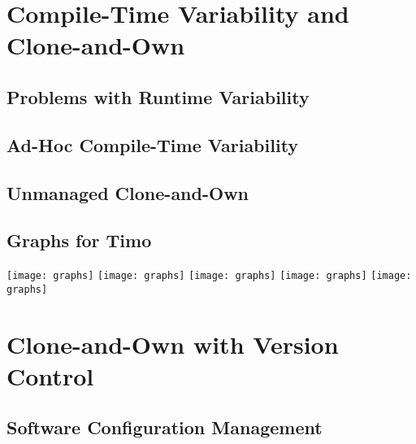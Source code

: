 \documentclass[
	aspectratio=169, %
	8pt, %
	handout, %
]{beamer}
\subtitle{3. Compile-Time Variability with Clone-and-Own}
\author{Timo Kehrer}
\begin{document}



\section{Compile-Time Variability and Clone-and-Own}

\subsection{Problems with Runtime Variability}
\subsection{Ad-Hoc Compile-Time Variability}
\subsection{Unmanaged Clone-and-Own}

\subsection{Graphs for Timo}
\begin{frame}{\insertsubsection}
	\begin{mycolumns}[columns=5]
		\texttt{[image: graphs]}
	\mynextcolumn
		\texttt{[image: graphs]}
	\mynextcolumn
		\texttt{[image: graphs]}
	\mynextcolumn
		\texttt{[image: graphs]}
	\mynextcolumn
		\texttt{[image: graphs]}
	\end{mycolumns}
\end{frame}

\lessonslearned{
	\item \ldots
}{
	\item \ldots
}{
	\item \ldots
}

\sectionend

\section{Clone-and-Own with Version Control}

\subsection{Software Configuration Management}
\end{document}
